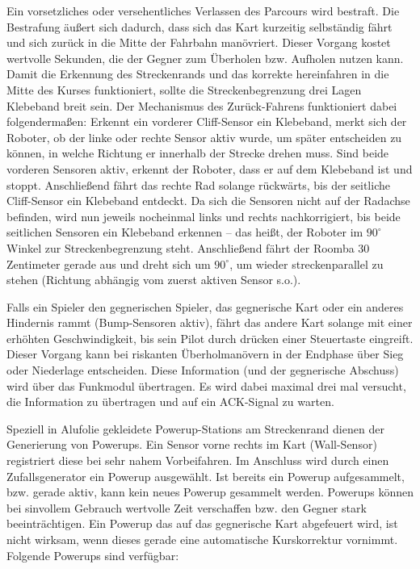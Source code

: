 Ein vorsetzliches oder versehentliches Verlassen des Parcours wird bestraft. Die Bestrafung äußert sich dadurch, dass sich das Kart kurzeitig selbständig fährt und sich zurück in die Mitte der Fahrbahn manövriert. Dieser Vorgang kostet wertvolle Sekunden, die der Gegner zum Überholen bzw. Aufholen nutzen kann. Damit die Erkennung des Streckenrands und das korrekte hereinfahren in die Mitte des Kurses funktioniert, sollte die Streckenbegrenzung drei Lagen Klebeband breit sein. Der Mechanismus des Zurück-Fahrens funktioniert dabei folgendermaßen: Erkennt ein vorderer Cliff-Sensor ein Klebeband, merkt sich der Roboter, ob der linke oder rechte Sensor aktiv wurde, um später entscheiden zu können, in welche Richtung er innerhalb der Strecke drehen muss. Sind beide vorderen Sensoren aktiv, erkennt der Roboter, dass er auf dem Klebeband ist und stoppt. Anschließend fährt das rechte Rad solange rückwärts, bis der seitliche Cliff-Sensor ein Klebeband entdeckt. Da sich die Sensoren nicht auf der Radachse befinden, wird nun jeweils nocheinmal links und rechts nachkorrigiert, bis beide seitlichen Sensoren ein Klebeband erkennen – das heißt, der Roboter im $90^\circ$ Winkel zur Streckenbegrenzung steht. Anschließend fährt der Roomba 30 Zentimeter gerade aus und dreht sich um $90^\circ$, um wieder streckenparallel zu stehen (Richtung abhängig vom zuerst aktiven Sensor s.o.).

Falls ein Spieler den gegnerischen Spieler, das gegnerische Kart oder ein anderes Hindernis rammt (Bump-Sensoren aktiv), fährt das andere Kart solange mit einer erhöhten Geschwindigkeit, bis sein Pilot durch drücken einer Steuertaste eingreift. Dieser Vorgang kann bei riskanten Überholmanövern in der Endphase über Sieg oder Niederlage entscheiden. Diese Information (und der gegnerische Abschuss) wird über das Funkmodul übertragen. Es wird dabei maximal drei mal versucht, die Information zu übertragen und auf ein ACK-Signal zu warten. 

Speziell in Alufolie gekleidete Powerup-Stations am Streckenrand dienen der Generierung von Powerups. Ein Sensor vorne rechts im Kart (Wall-Sensor) registriert diese bei sehr nahem Vorbeifahren. Im Anschluss wird durch einen Zufallsgenerator ein Powerup ausgewählt. Ist bereits ein Powerup aufgesammelt, bzw. gerade aktiv, kann kein neues Powerup gesammelt werden. Powerups können bei sinvollem Gebrauch wertvolle Zeit verschaffen bzw. den Gegner stark beeinträchtigen. Ein Powerup das auf das gegnerische Kart abgefeuert wird, ist nicht wirksam, wenn dieses gerade eine automatische Kurskorrektur vornimmt. Folgende Powerups sind verfügbar: 


